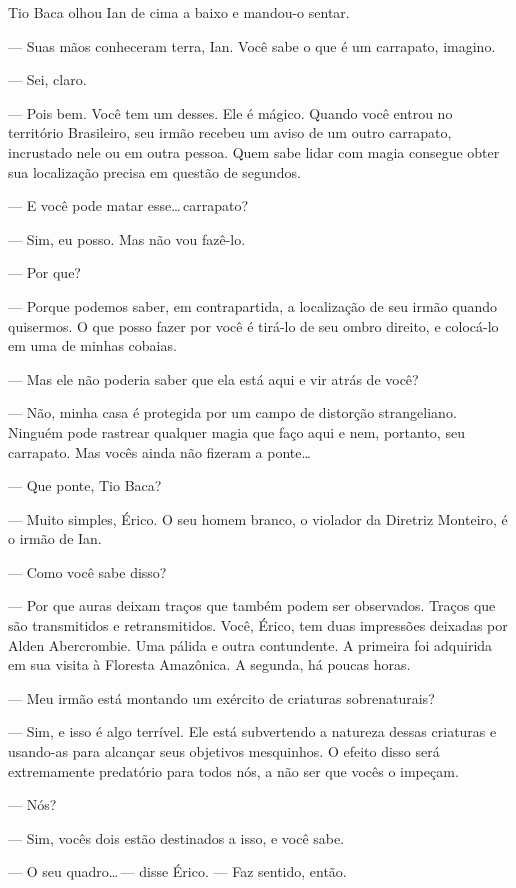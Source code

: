 Tio Baca olhou Ian de cima a baixo e mandou-o sentar.

--- Suas mãos conheceram terra, Ian. Você sabe o que é um carrapato, imagino.

--- Sei, claro.

--- Pois bem. Você tem um desses. Ele é mágico. Quando você entrou no
território Brasileiro, seu irmão recebeu um aviso de um outro carrapato,
incrustado nele ou em outra pessoa. Quem sabe lidar com magia consegue obter
sua localização precisa em questão de segundos.

--- E você pode matar esse\ldots\,carrapato?

--- Sim, eu posso. Mas não vou fazê-lo.

--- Por que?

--- Porque podemos saber, em contrapartida, a localização de seu irmão quando
quisermos. O que posso fazer por você é tirá-lo de seu ombro direito, e
colocá-lo em uma de minhas cobaias.

--- Mas ele não poderia saber que ela está aqui e vir atrás de você?

--- Não, minha casa é protegida por um campo de distorção strangeliano. Ninguém
pode rastrear qualquer magia que faço aqui e nem, portanto, seu carrapato. Mas
vocês ainda não fizeram a ponte\ldots

--- Que ponte, Tio Baca?

--- Muito simples, Érico. O seu homem branco, o violador da Diretriz Monteiro,
é o irmão de Ian.

--- Como você sabe disso?

--- Por que auras deixam traços que também podem ser observados. Traços que são
transmitidos e retransmitidos. Você, Érico, tem duas impressões deixadas por
Alden Abercrombie. Uma pálida e outra contundente. A primeira foi adquirida em
sua visita à Floresta Amazônica. A segunda, há poucas horas.

--- Meu irmão está montando um exército de criaturas sobrenaturais?

--- Sim, e isso é algo terrível. Ele está subvertendo a natureza dessas
criaturas e usando-as para alcançar seus objetivos mesquinhos. O efeito disso
será extremamente predatório para todos nós, a não ser que vocês o impeçam.

--- Nós?

--- Sim, vocês dois estão destinados a isso, e você sabe.

--- O seu quadro\ldots\,--- disse Érico. --- Faz sentido, então.

